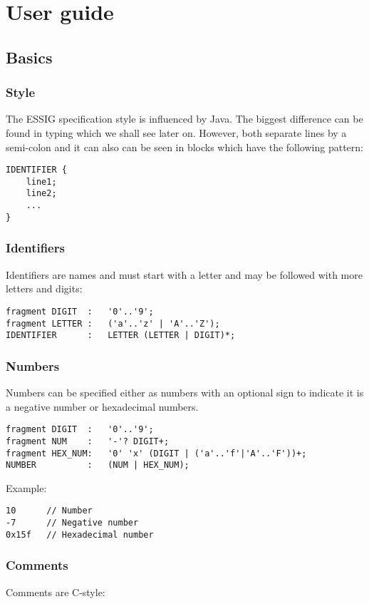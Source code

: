 \chapter{User guide}
\section{Basics}
\subsection{Style}
The \ac{ESSIG} specification style is influenced by Java. The biggest
difference can be found in typing which we shall see later on. However, both
separate lines by a semi-colon and it can also can be seen in blocks which have
the following pattern:

\begin{lstlisting}
IDENTIFIER {
	line1;
	line2;
	...
}
\end{lstlisting}


\subsection[IDENTIFIER]{Identifiers}
Identifiers are names and must start with a letter and may be followed with
more letters and digits:

\begin{lstlisting}
fragment DIGIT	:	'0'..'9';
fragment LETTER	:	('a'..'z' | 'A'..'Z');
IDENTIFIER		:	LETTER (LETTER | DIGIT)*;
\end{lstlisting}

\subsection{Numbers}
Numbers can be specified either as numbers with an optional sign to indicate it
is a negative number or hexadecimal numbers.

\begin{lstlisting}
fragment DIGIT	:	'0'..'9';
fragment NUM	:	'-'? DIGIT+;
fragment HEX_NUM:	'0' 'x' (DIGIT | ('a'..'f'|'A'..'F'))+;
NUMBER			:	(NUM | HEX_NUM);
\end{lstlisting}

Example:
\begin{lstlisting}
10		// Number
-7		// Negative number
0x15f	// Hexadecimal number
\end{lstlisting}

\subsection{Comments}
Comments are C-style:

